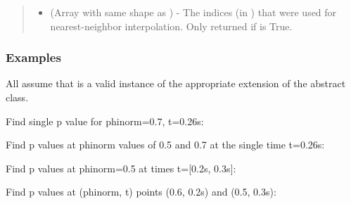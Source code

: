 \documentclass[letterpaper,10pt,english]{sphinxmanual}
\begin{document}
\begin{fulllineitems}
\begin{fulllineitems}
\begin{quote}
\begin{description}
\begin{itemize}
\item {} 
 (Array with same shape as ) - The indices
(in ) that were used for
nearest-neighbor interpolation. Only returned if  is
True.

\end{itemize}


\end{description}\end{quote}
\subsubsection*{Examples}

All assume that  is a valid instance of the appropriate
extension of the {\hyperref[\detokenize{eqtools:eqtools.core.Equilibrium}]{}} abstract class.

Find single p value for phinorm=0.7, t=0.26s:

\begin{sphinxVerbatim}[commandchars=\\\{\}]
   
\end{sphinxVerbatim}

Find p values at phinorm values of 0.5 and 0.7 at the single time
t=0.26s:

\begin{sphinxVerbatim}[commandchars=\\\{\}]
  \PYG{p}{[} \PYG{p}{]} 
\end{sphinxVerbatim}

Find p values at phinorm=0.5 at times t={[}0.2s, 0.3s{]}:

\begin{sphinxVerbatim}[commandchars=\\\{\}]
   \PYG{p}{[} \PYG{p}{]}
\end{sphinxVerbatim}

Find p values at (phinorm, t) points (0.6, 0.2s) and (0.5, 0.3s):


\end{fulllineitems}
\end{fulllineitems}
\end{document}
